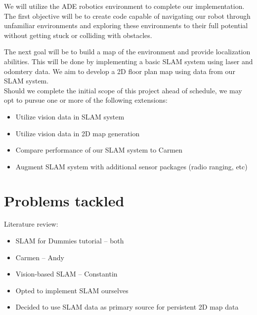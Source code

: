 \documentclass[12pt]{article}
\begin{document}
We will utilize the ADE robotics environment to complete our implementation.
The first objective will be to create code capable of navigating our robot
through unfamiliar environments and exploring these environments to their full
potential without getting stuck or colliding with obstacles. 

The next goal will be to build a map of the environment and provide
localization abilities. This will be done by implementing a basic SLAM
system using laser and odomtery data.  We aim to develop a 2D floor plan map
using data from our SLAM system.\\

Should we complete the initial scope of this project ahead of schedule, we may
opt to pursue one or more of the following extensions:

\begin{itemize}
    \setlength{\itemsep}{0pt}
    \setlength{\parskip}{0pt}
    \setlength{\parsep}{0pt}
    \item Utilize vision data in SLAM system
    \item Utilize vision data in 2D map generation
    \item Compare performance of our SLAM system to Carmen
    \item Augment SLAM system with additional sensor packages (radio ranging,
          etc)
\end{itemize}


\section{Problems tackled}

Literature review:
\begin{itemize}
    \setlength{\itemsep}{0pt}
    \setlength{\parskip}{0pt}
    \setlength{\parsep}{0pt}
    \item SLAM for Dummies tutorial -- both
    \item Carmen -- Andy
    \item Vision-based SLAM -- Constantin
\end{itemize}

\begin{itemize}
    \setlength{\itemsep}{0pt}
    \setlength{\parskip}{0pt}
    \setlength{\parsep}{0pt}
    \item Opted to implement SLAM ourselves
    \item Decided to use SLAM data as primary source for persistent 2D map data
\end{itemize}
\end{document}
